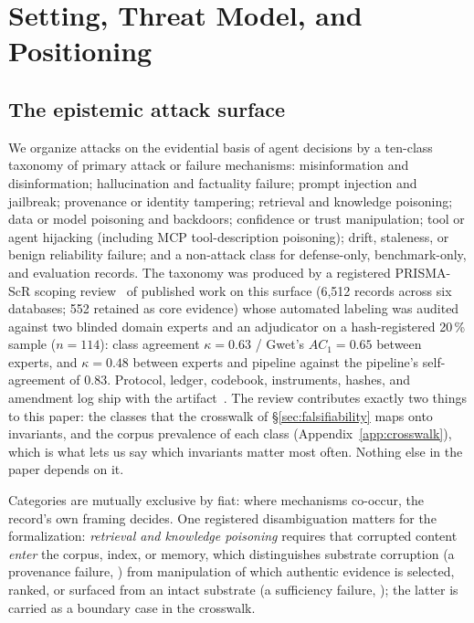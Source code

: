 \section{Setting, Threat Model, and Positioning}
\label{sec:setting}

\subsection{The epistemic attack surface}
\label{sec:taxonomy}
We organize attacks on the evidential basis of agent decisions by a
ten-class taxonomy of primary attack or failure mechanisms:
misinformation and disinformation; hallucination and factuality
failure; prompt injection and jailbreak; provenance or identity
tampering; retrieval and knowledge poisoning; data or model
poisoning and backdoors; confidence or trust manipulation; tool or
agent hijacking (including MCP tool-description poisoning); drift,
staleness, or benign reliability failure; and a non-attack class for
defense-only, benchmark-only, and evaluation records. The taxonomy was
produced by a registered PRISMA-ScR scoping review~\cite{prisma} of
published work on this surface (6,512 records across six databases;
552 retained as core evidence) whose automated labeling was audited
against two blinded domain experts and an adjudicator on a
hash-registered 20\,\% sample ($n{=}114$): class agreement $\kappa =
0.63$ / Gwet's $AC_1 = 0.65$ between experts, and $\kappa = 0.48$
between experts and pipeline against the pipeline's self-agreement of
0.83. Protocol, ledger, codebook, instruments, hashes, and amendment
log ship with the artifact~\cite{artifact}. The review contributes exactly two things to
this paper: the classes that the crosswalk of
\S\ref{sec:falsifiability} maps onto invariants, and the corpus
prevalence of each class (Appendix~\ref{app:crosswalk}), which is what lets
us say which invariants matter most often. Nothing else in the paper
depends on it.

Categories are mutually exclusive by fiat: where mechanisms co-occur,
the record's own framing decides. One registered disambiguation matters
for the formalization: \emph{retrieval and knowledge poisoning} requires
that corrupted content \emph{enter} the corpus, index, or memory, which
distinguishes substrate corruption (a provenance failure, \Ione) from
manipulation of which authentic evidence is selected, ranked, or
surfaced from an intact substrate (a sufficiency failure, \Ithree); the
latter is carried as a boundary case in the crosswalk.

